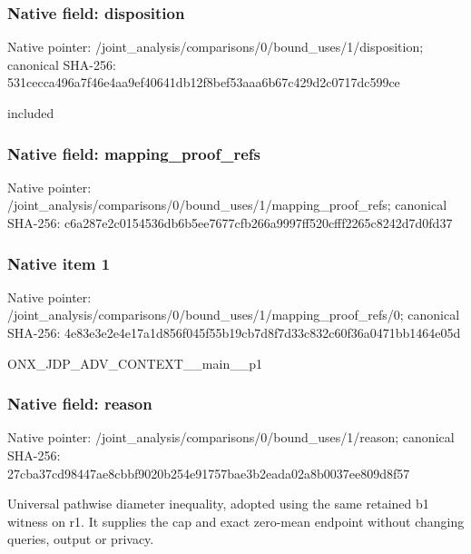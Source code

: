 \documentclass[10pt,a4paper]{article}
\begin{document}
\subsubsection{Native field: disposition}
Native pointer: /joint\_\allowbreak{}analysis/comparisons/0/bound\_\allowbreak{}uses/1/disposition; canonical SHA-256: 531cecca496a7f46e4aa9ef40641db12f8bef53aaa6b67c429d2c0717dc599ce

\begingroup\raggedright\sloppy included\par\endgroup

\subsubsection{Native field: mapping\_\allowbreak{}proof\_\allowbreak{}refs}
Native pointer: /joint\_\allowbreak{}analysis/comparisons/0/bound\_\allowbreak{}uses/1/mapping\_\allowbreak{}proof\_\allowbreak{}refs; canonical SHA-256: c6a287e2c0154536db6b5ee7677cfb266a9997ff520cfff2265c8242d7d0fd37

\subsubsection{Native item 1}
Native pointer: /joint\_\allowbreak{}analysis/comparisons/0/bound\_\allowbreak{}uses/1/mapping\_\allowbreak{}proof\_\allowbreak{}refs/0; canonical SHA-256: 4e83e3e2e4e17a1d856f045f55b19cb7d8f7d33c832c60f36a0471bb1464e05d

\begingroup\raggedright\sloppy ONX\_\allowbreak{}JDP\_\allowbreak{}ADV\_\allowbreak{}CONTEXT\_\allowbreak{}\_\allowbreak{}main\_\allowbreak{}\_\allowbreak{}p1\par\endgroup

\subsubsection{Native field: reason}
Native pointer: /joint\_\allowbreak{}analysis/comparisons/0/bound\_\allowbreak{}uses/1/reason; canonical SHA-256: 27cba37cd98447ae8cbbf9020b254e91757bae3b2eada02a8b0037ee809d8f57

\begingroup\raggedright\sloppy Universal pathwise diameter inequality,\allowbreak{} adopted using the same retained b1 witness on r1. It supplies the cap and exact zero-mean endpoint without changing queries,\allowbreak{} output or privacy.\par\endgroup
\end{document}
